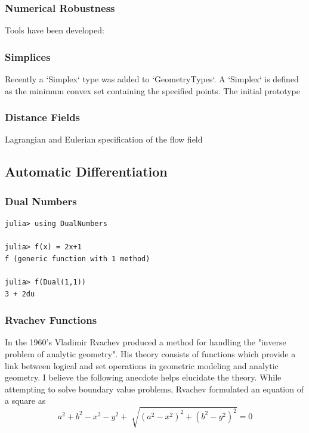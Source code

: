 \documentclass[a4paper]{article}
\begin{document}
\cite{Pasko_Adzhiev_Comninos_2008}

\subsubsection{Numerical Robustness}


Tools have been developed: \cite{Gappa}

\cite{Shewchuk}
\cite{Kettner_Mehlhorn_Pion_Schirra_Yap_2008}

\subsubsection{Simplices}

Recently a `Simplex` type was added to `GeometryTypes`. A `Simplex` is defined
as the minimum convex set containing the specified points. The initial
prototype

\subsubsection{Distance Fields}

Lagrangian and Eulerian specification of the flow field

\subsection{Automatic Differentiation}

\subsubsection{Dual Numbers}
\begin{lstlisting}
julia> using DualNumbers

julia> f(x) = 2x+1
f (generic function with 1 method)

julia> f(Dual(1,1))
3 + 2du
\end{lstlisting}


\subsubsection{Rvachev Functions}


In the 1960's Vladimir Rvachev produced a method for handling the "inverse
problem of analytic geometry". His theory consists of functions which provide a
link between logical and set operations in geometric modeling and analytic
geometry.\cite{shapiro1991theory} I believe the following anecdote helps
elucidate the theory. While attempting to solve boundary value problems,
Rvachev formulated an equation of a square as
\begin{equation*}
a^2 + b^2 − x^2 − y^2 + \sqrt[]{( a^2 − x^2 )^2 +( b^2 − y^2 )^2} =0
\end{equation*}
\end{document}
